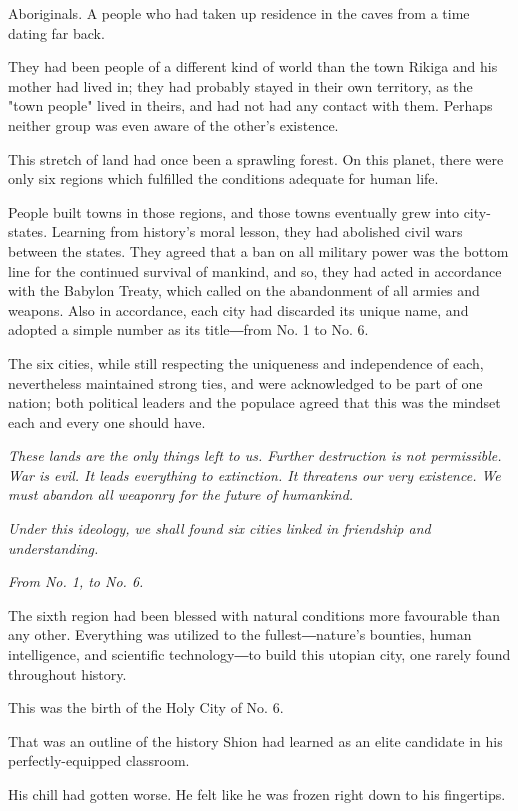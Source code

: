 Aboriginals. A people who had taken up residence in the caves from a
time dating far back.

They had been people of a different kind of world than the town Rikiga
and his mother had lived in; they had probably stayed in their own
territory, as the "town people" lived in theirs, and had not had any
contact with them. Perhaps neither group was even aware of the other's
existence.

This stretch of land had once been a sprawling forest. On this planet,
there were only six regions which fulfilled the conditions adequate for
human life.

People built towns in those regions, and those towns eventually grew
into city-states. Learning from history's moral lesson, they had
abolished civil wars between the states. They agreed that a ban on all
military power was the bottom line for the continued survival of
mankind, and so, they had acted in accordance with the Babylon Treaty,
which called on the abandonment of all armies and weapons. Also in
accordance, each city had discarded its unique name, and adopted a
simple number as its title―from No. 1 to No. 6.

The six cities, while still respecting the uniqueness and independence
of each, nevertheless maintained strong ties, and were acknowledged to
be part of one nation; both political leaders and the populace agreed
that this was the mindset each and every one should have.

\emph{These lands are the only things left to us. Further destruction is not
	permissible. War is evil. It leads everything to extinction. It
	threatens our very existence. We must abandon all weaponry for the
	future of humankind.}

\emph{Under this ideology, we shall found six cities linked in friendship and
	understanding.}

\emph{From No. 1, to No. 6.}

The sixth region had been blessed with natural conditions more
favourable than any other. Everything was utilized to the
fullest―nature's bounties, human intelligence, and scientific
technology―to build this utopian city, one rarely found throughout
history.

This was the birth of the Holy City of No. 6.

That was an outline of the history Shion had learned as an elite
candidate in his perfectly-equipped classroom.

His chill had gotten worse. He felt like he was frozen right down to his
fingertips.

